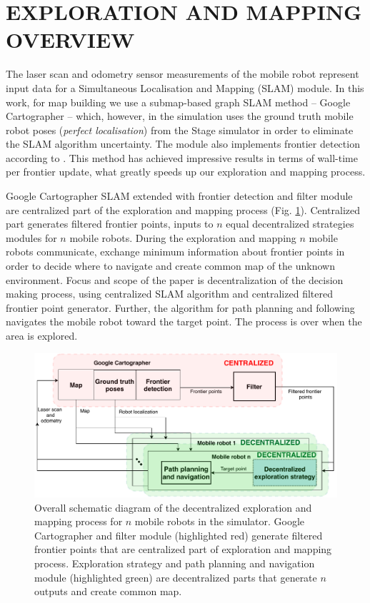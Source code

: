 \section{EXPLORATION AND MAPPING OVERVIEW}
The laser scan and odometry sensor measurements of the mobile robot represent input data for a Simultaneous Localisation and Mapping (SLAM) module. In this work, for map building we use a submap-based graph SLAM method -- Google Cartographer \cite{Hess2016} -- which, however, in the simulation uses the ground truth mobile robot poses (\textit {perfect localisation}) from the Stage simulator \cite{stageweb} in order to eliminate the SLAM algorithm uncertainty. The module also implements frontier detection according to \cite{Orsulic2019}. This method has achieved impressive results in terms of wall-time per frontier update, what greatly speeds up our exploration and mapping process. 

Google Cartographer SLAM extended with frontier detection and filter module are centralized part of the exploration and mapping process (Fig. \ref{fig:exploration-strategy}). Centralized part generates filtered frontier points, inputs to $n$ equal decentralized strategies modules for $n$ mobile robots. During the exploration and mapping $n$ mobile robots communicate, exchange minimum information about frontier points in order to decide where to navigate and create common map of the unknown environment. Focus and scope of the paper is decentralization of the decision making process, using centralized SLAM algorithm and centralized filtered frontier point generator. Further, the algorithm for path planning and following navigates the mobile robot toward the target point. The process is over when the area is explored.  

\begin{figure}[t!]
    \centering\includegraphics[width=1.0\columnwidth]{./Pictures/diagram_exploration.pdf}
	\caption{Overall schematic diagram of the decentralized exploration and mapping process for $n$ mobile robots in the simulator. Google Cartographer and filter module (highlighted red) generate filtered frontier points that are centralized part of exploration and mapping process. Exploration strategy and path planning and navigation module (highlighted green) are decentralized parts that generate $n$ outputs and create common map.}
   \label{fig:exploration-strategy}
\end{figure}

